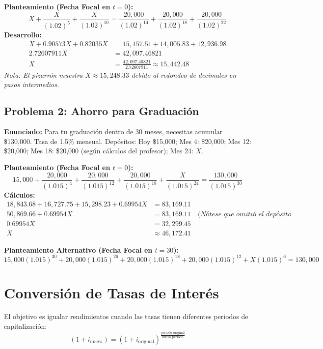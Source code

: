 \documentclass[12pt,a4paper]{article}
\begin{document}
\textbf{Planteamiento (Fecha Focal en \(t=0\)):}
\[
X + \frac{X}{(1.02)^5} + \frac{X}{(1.02)^{10}} = \frac{20,000}{(1.02)^{14}} + \frac{20,000}{(1.02)^{18}} + \frac{20,000}{(1.02)^{22}}
\]
\textbf{Desarrollo:}
\begin{align*}
X + 0.90573X + 0.82035X &= 15,157.51 + 14,005.83 + 12,936.98 \\
2.72607911X &= 42,097.46821 \\
X &= \frac{42,097.46821}{2.72607911} \approx 15,442.48
\end{align*}
\textit{Nota: El pizarrón muestra \(X \approx 15,248.33\) debido al redondeo de decimales en pasos intermedios.}

\subsection*{Problema 2: Ahorro para Graduación}
\textbf{Enunciado:} Para tu graduación dentro de 30 meses, necesitas acumular \$130,000. Tasa de 1.5\% mensual. Depósitos: Hoy \$15,000; Mes 4: \$20,000; Mes 12: \$20,000; Mes 18: \$20,000 (según cálculos del profesor); Mes 24: \(X\).

\textbf{Planteamiento (Fecha Focal en \(t=0\)):}
\[
15,000 + \frac{20,000}{(1.015)^4} + \frac{20,000}{(1.015)^{12}} + \frac{20,000}{(1.015)^{18}} + \frac{X}{(1.015)^{24}} = \frac{130,000}{(1.015)^{30}}
\]
\textbf{Cálculos:}
\begin{align*}
18,843.68 + 16,727.75 + 15,298.23 + 0.69954X &= 83,169.11 \\
50,869.66 + 0.69954X &= 83,169.11 \quad \textit{(Nótese que omitió el depósito inicial de 15k en la suma)} \\
0.69954X &= 32,299.45 \\
X &\approx 46,172.41
\end{align*}

\textbf{Planteamiento Alternativo (Fecha Focal en \(t=30\)):}
\[
15,000(1.015)^{30} + 20,000(1.015)^{26} + 20,000(1.015)^{18} + 20,000(1.015)^{12} + X(1.015)^6 = 130,000
\]

\newpage
\section{Conversión de Tasas de Interés}

\begin{tcolorbox}[colback=verdepizarra!5!white, colframe=verdepizarra, title=Equivalencia de Tasas]
El objetivo es igualar rendimientos cuando las tasas tienen diferentes periodos de capitalización:
\[ (1 + i_{\text{nueva}}) = (1 + i_{\text{original}})^{\frac{\text{periodo original}}{\text{nuevo periodo}}} \]
\end{tcolorbox}
\end{document}
